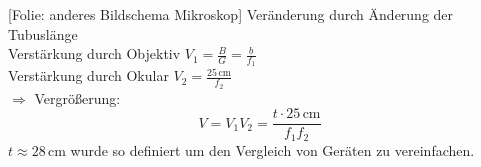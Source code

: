 \documentclass[titlepage,11pt,a4paper,ngerman]{report}
\newcommand{\tx}[1]{\textrm{#1}}
\newcommand{\folie}[1]{\color{gray}[Folie: #1]\color{black}}
\begin{document}
\begin{enumerate}[1)]
	
	\folie{anderes Bildschema Mikroskop} Veränderung durch Änderung der Tubuslänge\\
	Verstärkung durch Objektiv $ V_1 = \frac{B}{G} = \frac{b}{f_1} $\\
	Verstärkung durch Okular $ V_2 = \frac{25 \, \tx{cm}}{f_2} $\\
	$ \Rightarrow $ Vergrößerung: $$ V = V_1 V_2 = \frac{t \cdot 25 \, \tx{cm}}{f_1 f_2} $$
	$ t \approx 28 \, \tx{cm} $ wurde so definiert um den Vergleich von Geräten zu vereinfachen.
\end{enumerate}










%
%
\end{document}
